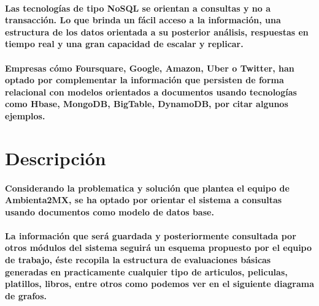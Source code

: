 \paragraph{Las tecnologías de tipo NoSQL se orientan a consultas y no a transacción. Lo que brinda un fácil acceso a la información, una estructura de los datos orientada a su posterior análisis, respuestas en tiempo real y una gran capacidad de escalar y replicar.}

\paragraph{Empresas cómo Foursquare, Google, Amazon, Uber o Twitter, han optado por complementar la información que persisten de forma relacional con modelos orientados a documentos usando tecnologías como Hbase, MongoDB, BigTable, DynamoDB, por citar algunos ejemplos.}

\section{Descripción}
\paragraph{Considerando la problematica y solución que plantea el equipo de Ambienta2MX, se ha optado por orientar el sistema a consultas usando documentos como modelo de datos base. }

\paragraph{La información que será guardada y posteriormente consultada por otros módulos del sistema seguirá un esquema propuesto por el equipo de trabajo, éste recopila la estructura de evaluaciones básicas generadas en practicamente cualquier tipo de articulos, peliculas, platillos, libros, entre otros como podemos ver en el siguiente diagrama de grafos.}

